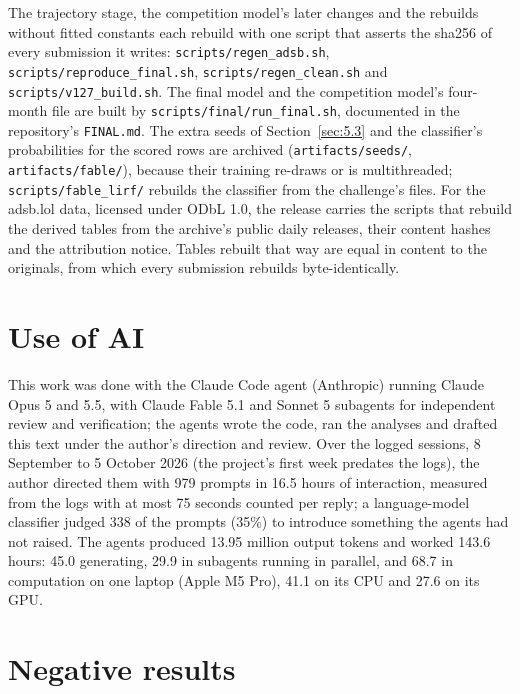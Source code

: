 \documentclass[
  manuscript=article,
  layout=preprint,
  year=2026,
  volume=x,
]{extra/joas}
\begin{document}
The trajectory stage, the competition model's later changes and the rebuilds without fitted constants each rebuild with one script that asserts the sha256 of every submission it writes: \texttt{scripts/regen\_adsb.sh}, \texttt{scripts/reproduce\_final.sh}, \texttt{scripts/regen\_clean.sh} and \texttt{scripts/v127\_build.sh}. The final model and the competition model's four-month file are built by \texttt{scripts/final/run\_final.sh}, documented in the repository's \texttt{FINAL.md}. The extra seeds of Section~\ref{sec:5.3} and the classifier's probabilities for the scored rows are archived (\texttt{artifacts/seeds/}, \texttt{artifacts/fable/}), because their training re-draws or is multithreaded; \texttt{scripts/fable\_lirf/} rebuilds the classifier from the challenge's files. For the adsb.lol data, licensed under ODbL 1.0, the release carries the scripts that rebuild the derived tables from the archive's public daily releases, their content hashes and the attribution notice. Tables rebuilt that way are equal in content to the originals, from which every submission rebuilds byte-identically.

\section*{Use of AI}
This work was done with the Claude Code agent (Anthropic) running Claude Opus 5 and 5.5, with Claude Fable 5.1 and Sonnet 5 subagents for independent review and verification; the agents wrote the code, ran the analyses and drafted this text under the author's direction and review. Over the logged sessions, 8 September to 5 October 2026 (the project's first week predates the logs), the author directed them with 979 prompts in 16.5 hours of interaction, measured from the logs with at most 75 seconds counted per reply; a language-model classifier judged 338 of the prompts (35\%) to introduce something the agents had not raised. The agents produced 13.95 million output tokens and worked 143.6 hours: 45.0 generating, 29.9 in subagents running in parallel, and 68.7 in computation on one laptop (Apple M5 Pro), 41.1 on its CPU and 27.6 on its GPU.

\printbibliography

\clearpage
\appendix

\section{Negative results}\label{sec:A}
\end{document}
